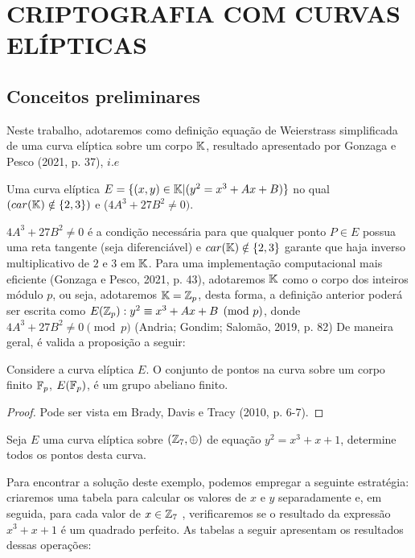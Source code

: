 \section{CRIPTOGRAFIA COM CURVAS ELÍPTICAS}

\subsection{Conceitos preliminares}

Neste trabalho, adotaremos como definição equação de Weierstrass simplificada
de uma curva elíptica sobre um corpo $\mathbb{K}$, resultado apresentado por Gonzaga e
Pesco (2021, p. 37), $i.e$

\begin{definicao}
	Uma curva elíptica $E  = \{(x, y) \in \mathbb{K} | (y^2 = x^3 + Ax + B)\}$ no qual $(car(\mathbb{K}) \notin \{2,3\})$
	e ($4A^3 +27B^2 \neq 0)$.
\end{definicao}

$4A^3 +27B^2 \neq 0$ é a condição necessária para que qualquer ponto $P \in E$ possua uma reta tangente
(seja diferenciável) e $car(\mathbb{K}) \notin \{2,3\}$ garante que haja inverso multiplicativo de $2$ e $3$ em
$\mathbb{K}$. Para uma implementação computacional mais eficiente (Gonzaga e Pesco, 2021, p. 43), adotaremos $\mathbb{K}$ como o corpo
dos inteiros módulo $p$, ou seja, adotaremos $\mathbb{K} = \mathbb{Z}_{p}$, desta forma, a definição anterior poderá ser
escrita como $E(\mathbb{Z}_{p}): y^2 \equiv x^3 + Ax + B \pmod{p}$, donde $4A^3 +27B^2 \neq 0 \pmod{p}$ (Andria; Gondim; Salomão, 2019, p. 82)
De maneira geral, é valida a proposição a seguir:

\begin{proposicao}
	Considere a curva elíptica $E$. O conjunto de pontos na curva sobre um corpo finito $\mathbb{F}_{p}$,
	$E(\mathbb{F}_{p})$, é um grupo abeliano finito.
\end{proposicao}

\begin{proof}
	Pode ser vista em Brady, Davis e Tracy (2010, p. 6-7).
\end{proof}

\begin{exemplo} \label{exemplo:cf947430-c71a-43f2-893a-13b1cd929605}
	Seja $E$ uma curva elíptica sobre $(\mathbb{Z}_{7}, \oplus)$ de equação $y^2 = x^3 + x + 1$, determine todos
	os pontos desta curva.
\end{exemplo}

Para encontrar a solução deste exemplo, podemos empregar a seguinte estratégia:
criaremos uma tabela para calcular os valores de $x$ e $y$ separadamente e, em
seguida, para cada valor de $x \in \mathbb{Z}_{7}$ , verificaremos se o resultado da
expressão $x^3 + x + 1$ é um quadrado perfeito. As tabelas a seguir apresentam
os resultados dessas operações:

